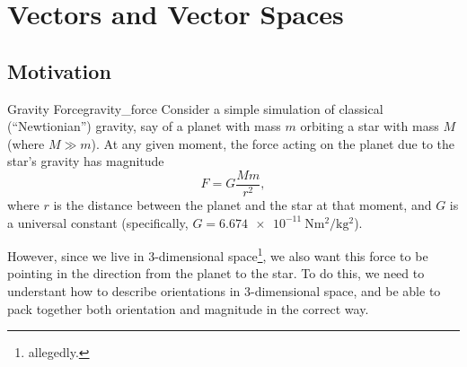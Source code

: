 \section{Vectors and Vector Spaces}
\subsection{Motivation} %
\begin{motivation}{Gravity Force}{gravity_force}
	Consider a simple simulation of classical (\enquote{Newtionian}) gravity, say of a planet with mass $m$ orbiting a star with mass $M$ (where $M\gg m$). At any given moment, the force acting on the planet due to the star's gravity has magnitude
	\begin{equation}
		F = G\frac{Mm}{r^{2}},
		\label{eq:gravity_force}
	\end{equation}
	where $r$ is the distance between the planet and the star at that moment, and $G$ is a universal constant (specifically, $G=\SI{6.674e-11}{\newton\meter\squared\per\kilo\gram\squared}$).

	\vspace{1em}
	However, since we live in 3-dimensional space\footnote{allegedly.}, we also want this force to be pointing in the direction from the planet to the star. To do this, we need to understant how to describe orientations in 3-dimensional space, and be able to pack together both orientation and magnitude in the correct way.
\end{motivation}

